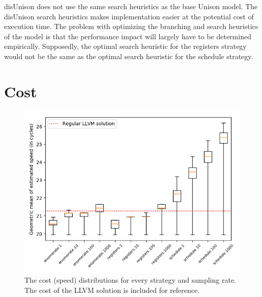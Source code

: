 disUnison does not use the same search heuristics as the base Unison model. The disUnison
search heuristics makes implementation easier at the potential cost of execution time. The
problem with optimizing the branching and search heuristics of the model is that the
performance impact will largely have to be determined empirically. Supposedly, the optimal
search heuristic for the registers strategy would not be the same as the optimal search
heuristic for the schedule strategy.

\section{Cost}

\begin{figure}[h]
	\centering
	\includegraphics[width=\textwidth,height=0.5\textheight]{results/figures/cost_speed}
	\caption{The cost (speed) distributions for every strategy and sampling rate. The cost of the LLVM solution is included for reference.}
	\label{fig:cost-speed}
\end{figure}


